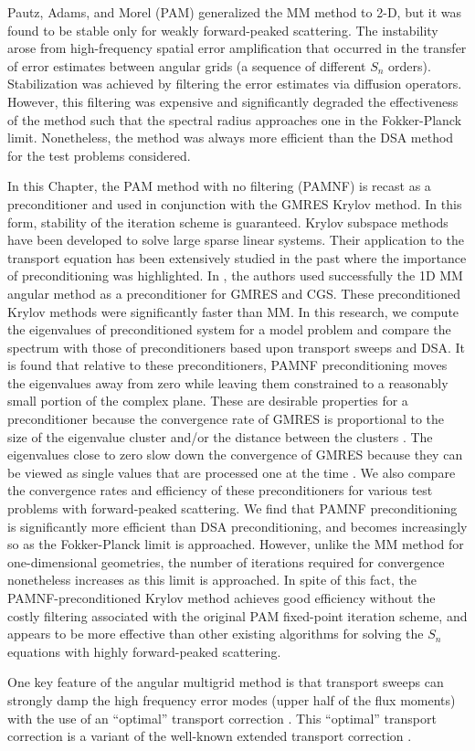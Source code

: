 Pautz, Adams, and Morel (PAM) \cite{multigrid_2d} generalized the MM method to
2-D, but it was found to be stable only for weakly forward-peaked scattering.
The instability arose from high-frequency spatial error amplification that
occurred in the transfer of error estimates between angular grids (a sequence
of different $S_n$ orders). Stabilization was achieved by filtering the error
estimates via diffusion operators. However, this filtering was expensive and
significantly degraded the effectiveness of the method such that the spectral
radius approaches one in the Fokker-Planck limit.  Nonetheless, the method was 
always more efficient than the DSA method for the test problems considered.

In this Chapter, the PAM method with no filtering (PAMNF) is recast as a 
preconditioner and used in conjunction with the GMRES Krylov method. In this form, 
stability of the iteration scheme is guaranteed. Krylov subspace methods have been 
developed to solve large sparse linear systems. Their application to the transport 
equation has been extensively studied in the past \cite{faber,oliveira,patton,warsa} 
where the importance of preconditioning was highlighted. In \cite{oliveira}, the 
authors used successfully the 1D MM angular method as a preconditioner for GMRES 
and CGS. These preconditioned Krylov methods were significantly faster than MM. 
In this research, we compute the eigenvalues of preconditioned system for a model 
problem and compare the spectrum with those of preconditioners based upon transport 
sweeps and DSA. It is found that relative to these preconditioners, PAMNF 
preconditioning moves the eigenvalues away from zero while leaving them 
constrained to a reasonably small portion of the complex plane. These are 
desirable properties for a preconditioner because the convergence rate of GMRES 
is proportional to the size of the eigenvalue cluster and/or the distance between 
the clusters \cite{campbell,warsa}. The eigenvalues close to zero slow down the 
convergence of GMRES because they can be viewed as single values that are processed 
one at the time \cite{campbell,warsa}. We also compare the convergence rates and 
efficiency of these preconditioners for various test problems with forward-peaked 
scattering. We find that PAMNF preconditioning is significantly more efficient 
than DSA preconditioning, and becomes increasingly so as the Fokker-Planck limit 
is approached. However, unlike the MM method for one-dimensional geometries, 
the number of iterations required for convergence 
nonetheless increases as this limit is approached. In spite of this fact, 
the PAMNF-preconditioned Krylov method achieves good efficiency without the 
costly filtering associated with the original PAM fixed-point iteration scheme, 
and appears to be more effective than other existing algorithms for solving 
the $S_n$ equations with highly forward-peaked scattering.

One key feature of the angular multigrid method is that transport sweeps can
strongly damp the high frequency error modes (upper half of the flux moments)
with the use of an ``optimal'' transport correction \cite{multigrid_1d}. This
``optimal'' transport correction is a variant of the well-known extended
transport correction \cite{lathrop,morel_79}.
